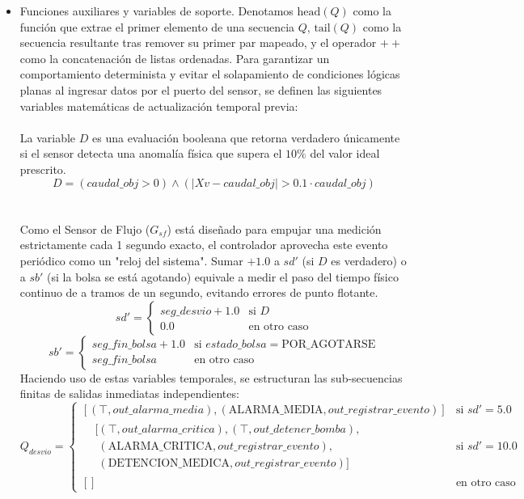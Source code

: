 \begin{itemize}
    \item Funciones auxiliares y variables de soporte. Denotamos $\text{head}(Q)$ como la función que extrae el primer elemento de una secuencia $Q$, $\text{tail}(Q)$ como la secuencia resultante tras remover su primer par mapeado, y el operador $\mathbin{++}$ como la concatenación de listas ordenadas. Para garantizar un comportamiento determinista y evitar el solapamiento de condiciones lógicas planas al ingresar datos por el puerto del sensor, se definen las siguientes variables matemáticas de actualización temporal previa:
    \\\\La variable $D$ es una evaluación booleana que retorna verdadero únicamente si el sensor detecta una anomalía física que supera el $10\%$ del valor ideal prescrito.
    \[
    D = (caudal\_obj > 0) \land (|Xv - caudal\_obj| > 0.1 \cdot caudal\_obj)
    \]
    \\\\ Como el Sensor de Flujo ($G_{sf}$) está diseñado para empujar una medición estrictamente cada 1 segundo exacto, el controlador aprovecha este evento periódico como un "reloj del sistema". Sumar $+1.0$ a $sd'$ (si $D$ es verdadero) o a $sb'$ (si la bolsa se está agotando) equivale a medir el paso del tiempo físico continuo de a tramos de un segundo, evitando errores de punto flotante.
    \[
    sd' = \begin{cases} seg\_desvio + 1.0 & \text{si } D \\ 0.0 & \text{en otro caso} \end{cases}
    \]
    \[
    sb' = \begin{cases} seg\_fin\_bolsa + 1.0 & \text{si } estado\_bolsa = \text{POR\_AGOTARSE} \\ seg\_fin\_bolsa & \text{en otro caso} \end{cases}
    \]
    Haciendo uso de estas variables temporales, se estructuran las sub-secuencias finitas de salidas inmediatas independientes:
    \[
    Q_{desvio} = \begin{cases} 
    [(\top, out\_alarma\_media), (\text{ALARMA\_MEDIA}, out\_registrar\_evento)] & \text{si } sd' = 5.0 \\ 
    \begin{aligned}
    &[(\top, out\_alarma\_critica), (\top, out\_detener\_bomba), \\
    &\; (\text{ALARMA\_CRITICA}, out\_registrar\_evento), \\
    &\; (\text{DETENCION\_MEDICA}, out\_registrar\_evento)]
    \end{aligned} & \text{si } sd' = 10.0 \\ 
    [ ] & \text{en otro caso} 
    \end{cases}
    \]


\end{itemize}
